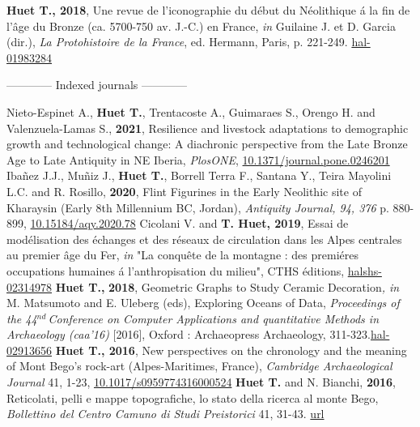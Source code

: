\documentclass{article}
\begin{document}
\smallbreak
\textbf{Huet T., 2018}, Une revue de l'iconographie du d\'{e}but du N\'{e}olithique \'{a} la fin de l'\^{a}ge du Bronze (ca. 5700-750 av. J.-C.) en France, \textit{in} Guilaine J. et D. Garcia (dir.), \textit{La Protohistoire de la France}, ed. Hermann, Paris, p. 221-249. \href{https://hal.archives-ouvertes.fr/hal-01983284}{hal-01983284}
\bigbreak
\begin{center}------------ Indexed journals ------------\end{center}
\smallbreak
Nieto-Espinet A., \textbf{Huet T.}, Trentacoste A., Guimaraes S., Orengo H. and Valenzuela-Lamas S., \textbf{2021}, Resilience and livestock adaptations to demographic growth and technological change: A diachronic perspective from the Late Bronze Age to Late Antiquity in NE Iberia, \textit{PlosONE}, \href{https://doi.org/10.1371/journal.pone.0246201}{10.1371/journal.pone.0246201}
\smallbreak
Iba\~{n}ez J.J., Mu\~{n}iz J., \textbf{Huet T.}, Borrell Terra F.,  Santana Y., Teira Mayolini L.C. and R. Rosillo, \textbf{2020}, Flint Figurines in the Early Neolithic site of Kharaysin (Early 8th Millennium BC, Jordan), \textit{Antiquity Journal, 94, 376} p. 880-899, \href{https://doi.org/10.15184/aqy.2020.78}{10.15184/aqy.2020.78}
\smallbreak
Cicolani V. and \textbf{T. Huet, 2019}, Essai de mod\'{e}lisation des \'{e}changes et des r\'{e}seaux de circulation dans les Alpes centrales au premier \^{a}ge du Fer, \textit{in} "La conqu\^{e}te de la montagne : des premi\'{e}res occupations humaines \'{a} l'anthropisation du milieu", CTHS \'{e}ditions, \href{https://halshs.archives-ouvertes.fr/halshs-02314978/document}{halshs-02314978}
\smallbreak
\textbf{Huet T.,} \textbf{2018}, Geometric Graphs to Study Ceramic Decoration\textit{, in} M. Matsumoto and  E. Uleberg (eds), Exploring Oceans of Data, \textit{Proceedings of the 44${}^{nd\ }$Conference on Computer Applications and quantitative Methods in Archaeology (caa'16) }[2016], Oxford : Archaeopress Archaeology, 311-323.\href{https://hal.archives-ouvertes.fr/hal-02913656}{hal-02913656}
\smallbreak
\textbf{Huet T., 2016}, New perspectives on the chronology and the meaning of Mont Bego's rock-art (Alpes-Maritimes, France), \textit{Cambridge Archaeological Journal} 41, 1-23, \href{https://doi.org/10.1017/s0959774316000524}{10.1017/s0959774316000524}
\smallbreak
\textbf{Huet T.} and N. Bianchi, \textbf{2016}, Reticolati, pelli e mappe topografiche, lo stato della ricerca al monte Bego, \textit{Bollettino del Centro Camuno di Studi Preistorici} 41, 31-43. \href{http://www.ccsp.it/web/infoccsp/bcsp/bcsp41_preview.pdf}{url}
\end{document}
